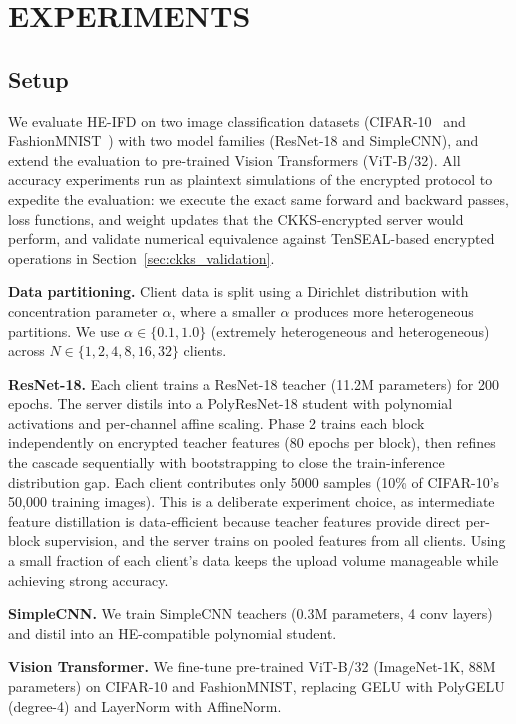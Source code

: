 \section{EXPERIMENTS}
\label{sec:experiments}

\subsection{Setup}
\label{sec:exp_setup}

We evaluate HE-IFD on two image classification datasets (CIFAR-10~\cite{krizhevsky2009learning} and FashionMNIST~\cite{xiao2017fashion}) with two model families (ResNet-18 and SimpleCNN), and extend the evaluation to pre-trained Vision Transformers (ViT-B/32). All accuracy experiments run as plaintext simulations of the encrypted protocol to expedite the evaluation: we execute the exact same forward and backward passes, loss functions, and weight updates that the CKKS-encrypted server would perform, and validate numerical equivalence against TenSEAL-based encrypted operations in Section~\ref{sec:ckks_validation}.

\textbf{Data partitioning.} Client data is split using a Dirichlet distribution with concentration parameter $\alpha$, where a smaller $\alpha$ produces more heterogeneous partitions. We use $\alpha \in \{0.1, 1.0\}$ (extremely heterogeneous and heterogeneous) across $N \in \{1, 2, 4, 8, 16, 32\}$ clients.

\textbf{ResNet-18.} Each client trains a ResNet-18 teacher (11.2M parameters) for 200 epochs. The server distils into a PolyResNet-18 student with polynomial activations and per-channel affine scaling. Phase 2 trains each block independently on encrypted teacher features (80 epochs per block), then refines the cascade sequentially with bootstrapping to close the train-inference distribution gap. Each client contributes only 5000 samples (10\% of CIFAR-10's 50,000 training images). This is a deliberate experiment choice, as intermediate feature distillation is data-efficient because teacher features provide direct per-block supervision, and the server trains on pooled features from all clients. Using a small fraction of each client's data keeps the upload volume manageable while achieving strong accuracy.

\textbf{SimpleCNN.} We train SimpleCNN teachers (0.3M parameters, 4 conv layers) and distil into an HE-compatible polynomial student. %

\textbf{Vision Transformer.} We fine-tune pre-trained ViT-B/32 (ImageNet-1K, 88M parameters) on CIFAR-10 and FashionMNIST, replacing GELU with PolyGELU (degree-4) and LayerNorm with AffineNorm. %

